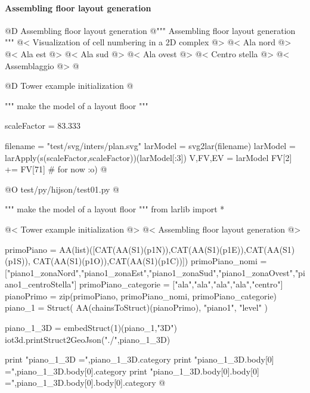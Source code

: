\documentclass[11pt,oneside]{article}    %
\begin{document}
\paragraph{Assembling floor layout generation}
@D Assembling floor layout generation
@{""" Assembling floor layout generation """
@< Visualization of cell numbering in a 2D complex @>
@< Ala nord @>
@< Ala est @>
@< Ala sud @>
@< Ala ovest @>
@< Centro stella @>
@< Assemblaggio @>
@}



@D Tower example initialization
@{""" make the model of a layout floor """

scaleFactor = 83.333

filename = "test/svg/inters/plan.svg"
larModel = svg2lar(filename)
larModel = larApply(s(scaleFactor,scaleFactor))(larModel[:3])
V,FV,EV = larModel
FV[2] += FV[71]      # for now :o)
@}


@O test/py/hijson/test01.py
@{""" make the model of a layout floor """
from larlib import *

@< Tower example initialization @>
@< Assembling floor layout generation @>

primoPiano = AA(list)([CAT(AA(S1)(p1N)),CAT(AA(S1)(p1E)),CAT(AA(S1)(p1S)), 
                CAT(AA(S1)(p1O)),CAT(AA(S1)(p1C))])
primoPiano_nomi = ["piano1_zonaNord","piano1_zonaEst","piano1_zonaSud","piano1_zonaOvest","piano1_centroStella"]
primoPiano_categorie = ["ala","ala","ala","ala","centro"]
pianoPrimo = zip(primoPiano, primoPiano_nomi, primoPiano_categorie)
piano_1 = Struct( AA(chainsToStruct)(pianoPrimo), "piano1", "level" )

piano_1_3D = embedStruct(1)(piano_1,"3D")
iot3d.printStruct2GeoJson("./",piano_1_3D)

print "piano_1_3D =",piano_1_3D.category
print "piano_1_3D.body[0] =",piano_1_3D.body[0].category
print "piano_1_3D.body[0].body[0] =",piano_1_3D.body[0].body[0].category
@}
\end{document}

